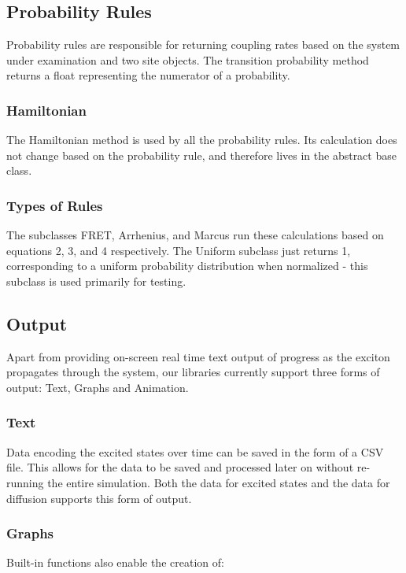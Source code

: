\documentclass{article}
\begin{document}
\subsection{Probability Rules}

Probability rules are responsible for returning coupling rates based on the system under examination and two site objects. The transition probability method returns a float representing the numerator of a probability. 



\subsubsection{Hamiltonian}

The Hamiltonian method is used by all the probability rules. Its calculation does not change based on the probability rule, and therefore lives in the abstract base class.



\subsubsection{Types of Rules}

The subclasses FRET, Arrhenius, and Marcus run these calculations based on equations 2, 3, and 4 respectively. The Uniform subclass just returns 1, corresponding to a uniform probability distribution when normalized - this subclass is used primarily for testing.


\subsection{Output}
Apart from providing on-screen real time text output of progress as the exciton propagates through the system, our libraries currently support three forms of output: Text, Graphs and Animation.

\subsubsection{Text}
Data encoding the excited states over time can be saved in the form of a CSV file. This allows for the data to be saved and processed later on without re-running the entire simulation. Both the data for excited states and the data for diffusion supports this form of output.
\subsubsection{Graphs}
Built-in functions also enable the creation of:
\end{document}

